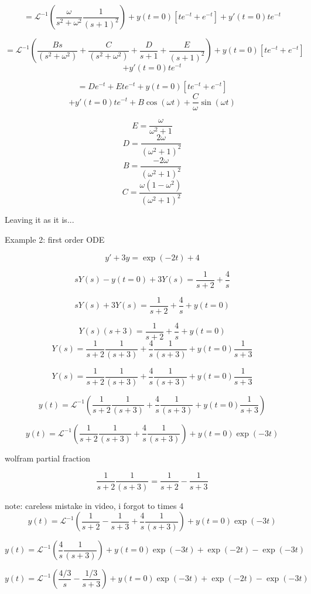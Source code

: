 \documentclass[17pt]{extarticle}
\begin{document}
$$= \mathcal{L}^{-1} \left(\frac{\omega}{s^2 + \omega^2} \frac{1}{(s+1)^2}\right) + y(t=0)\left[ te^{-t}  + e^{-t} \right] + y'(t=0) te^{-t} $$


$$= \mathcal{L}^{-1}(\frac{Bs}{(s^2+\omega^2)}+ \frac{C}{(s^2+\omega^2)}+ \frac{D}{s+1}+ \frac{E}{(s+1)^2}) + y(t=0)\left[ te^{-t} + e^{-t} \right] 
$$
$$+ y'(t=0) te^{-t} $$

$$= D e^{-t} + E te^{-t} + y(t=0)\left[ te^{-t} + e^{-t} \right] 
$$
$$+ y'(t=0) te^{-t} +B \cos (\omega t) + \frac{C}{\omega} \sin (\omega t)$$

$$E = \frac{\omega}{\omega^2+1}$$
$$D = \frac{2\omega}{(\omega^2+1)^2}$$
$$B = \frac{-2\omega}{(\omega^2+1)^2}$$
$$C = \frac{\omega(1-\omega^2)}{(\omega^2+1)^2}$$

Leaving it as it is...

Example 2: first order ODE

$$y' +3y = \exp(-2t) + 4$$

$$s Y(s) - y(t=0) + 3 Y(s) = \frac{1}{s+2} + \frac{4}{s}$$

$$s Y(s) + 3 Y(s) = \frac{1}{s+2} + \frac{4}{s} +  y(t=0)$$

$$Y(s)  (s + 3 ) = \frac{1}{s+2} + \frac{4}{s} +  y(t=0)$$
$$Y(s)   = \frac{1}{s+2} \frac{1}{(s + 3 )} + \frac{4}{s} \frac{1}{(s + 3 )} +  y(t=0) \frac{1}{s+3}$$

$$Y(s)   = \frac{1}{s+2} \frac{1}{(s + 3 )} + \frac{4}{s} \frac{1}{(s + 3 )} +  y(t=0) \frac{1}{s+3}$$

$$y(t)   = \mathcal{L}^{-1} \left( \frac{1}{s+2} \frac{1}{(s + 3 )} + \frac{4}{s} \frac{1}{(s + 3 )} +  y(t=0) \frac{1}{s+3} \right)$$


$$y(t)   = \mathcal{L}^{-1} \left( \frac{1}{s+2} \frac{1}{(s + 3 )} + \frac{4}{s} \frac{1}{(s + 3 )}  \right)+ y(t=0) \exp(-3t)$$

wolfram partial fraction

$$\frac{1}{s+2} \frac{1}{(s + 3 )} = \frac{1}{s+2} - \frac{1}{s+3}$$


note: careless mistake in video, i forgot to times 4
$$y(t)   = \mathcal{L}^{-1} \left( \frac{1}{s+2} - \frac{1}{s+3} + \frac{4}{s} \frac{1}{(s + 3 )}  \right)+ y(t=0) \exp(-3t)$$

$$y(t)   = \mathcal{L}^{-1} \left( \frac{4}{s} \frac{1}{(s + 3 )}  \right)+ y(t=0) \exp(-3t) + \exp(-2t) - \exp(-3t)$$

$$y(t)   = \mathcal{L}^{-1} \left( \frac{4/3}{s} -  \frac{1/3}{s + 3 }  \right)+ y(t=0) \exp(-3t) + \exp(-2t) - \exp(-3t)$$
\end{document}

